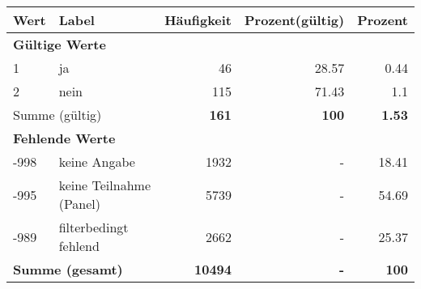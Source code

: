      \begin{longtable}{lXrrr}
     \toprule
     \textbf{Wert} & \textbf{Label} & \textbf{Häufigkeit} & \textbf{Prozent(gültig)} & \textbf{Prozent} \\
     \endhead
     \midrule
     \multicolumn{5}{l}{\textbf{Gültige Werte}}\\

     1 &
     \multicolumn{1}{X}{ ja   } &


       \num{46} &
       \num[round-mode=places,round-precision=2]{28.57} &
         \num[round-mode=places,round-precision=2]{0.44} \\

     2 &
     \multicolumn{1}{X}{ nein   } &


       \num{115} &
       \num[round-mode=places,round-precision=2]{71.43} &
         \num[round-mode=places,round-precision=2]{1.1} \\
     \midrule
     \multicolumn{2}{l}{Summe (gültig)} &
       \textbf{\num{161}} &
     \textbf{\num{100}} &
       \textbf{\num[round-mode=places,round-precision=2]{1.53}} \\
     \multicolumn{5}{l}{\textbf{Fehlende Werte}}\\
       -998 &
       keine Angabe &
         \num{1932} &
        - &
         \num[round-mode=places,round-precision=2]{18.41} \\
       -995 &
       keine Teilnahme (Panel) &
         \num{5739} &
        - &
         \num[round-mode=places,round-precision=2]{54.69} \\
       -989 &
       filterbedingt fehlend &
         \num{2662} &
        - &
         \num[round-mode=places,round-precision=2]{25.37} \\
     \midrule
     \multicolumn{2}{l}{\textbf{Summe (gesamt)}} &
          \textbf{\num{10494}} &
        \textbf{-} &
        \textbf{\num{100}} \\
     \bottomrule
     \end{longtable}
     
